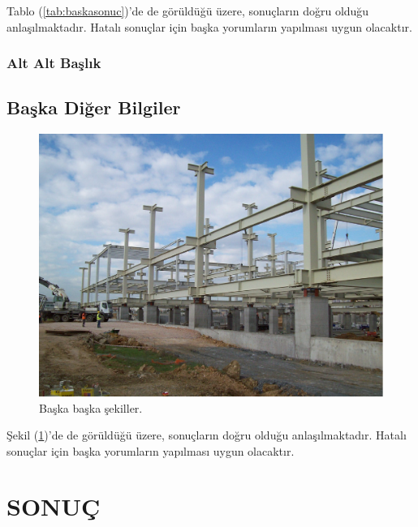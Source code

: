 \documentclass[turkish]{eqengconf}
\begin{document}
Tablo (\ref{tab:baskasonuc})'de de görüldüğü üzere, sonuçların doğru olduğu anlaşılmaktadır. Hatalı sonuçlar için başka yorumların yapılması uygun olacaktır.

\blindtext

\subsubsection{Alt Alt Başlık}
\blindtext

\blindtext

\subsection{Başka Diğer Bilgiler}
\blindtext

\blindtext

\begin{figure}[h]
	\centering
	\includegraphics[scale=0.4]{b.PNG}
	\caption{\label{fig:ikinciyapi} Başka başka şekiller.}
\end{figure}

Şekil (\ref{fig:ikinciyapi})'de de görüldüğü üzere, sonuçların doğru olduğu anlaşılmaktadır. Hatalı sonuçlar için başka yorumların yapılması uygun olacaktır.

\blindtext

\section{SONUÇ}
\blindtext

\blindtext

\printbibliography
\end{document}
